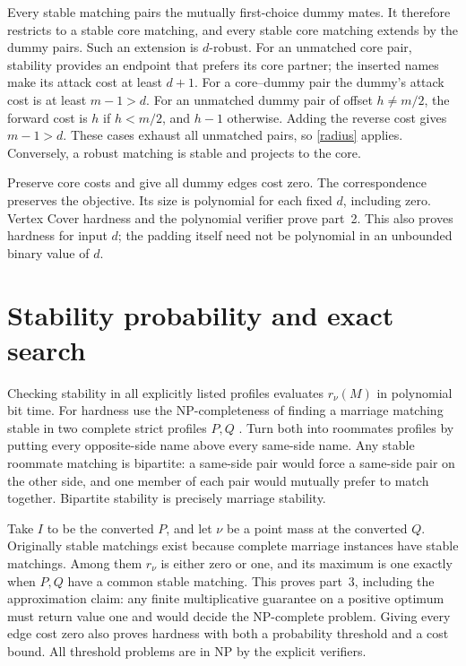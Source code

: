 \documentclass[11pt]{article}
\begin{document}
Every stable matching pairs the mutually first-choice dummy mates.
It therefore restricts to a stable core matching, and every stable core
matching extends by the dummy pairs. Such an extension is $d$-robust.
For an unmatched core pair, stability provides an endpoint that prefers
its core partner; the inserted names make its attack cost at least $d+1$.
For a core--dummy pair the dummy's attack cost is at least $m-1>d$.
For an unmatched dummy pair of offset $h\ne m/2$, the forward cost is
$h$ if $h<m/2$, and $h-1$ otherwise. Adding the reverse cost gives
$m-1>d$. These cases exhaust all unmatched pairs, so
\eqref{radius} applies. Conversely, a robust matching is stable and
projects to the core.

Preserve core costs and give all dummy edges cost zero. The correspondence
preserves the objective. Its size is polynomial for each fixed $d$,
including zero. Vertex Cover hardness and the polynomial verifier prove
part~2. This also proves hardness for input $d$; the padding itself need
not be polynomial in an unbounded binary value of $d$.

\section{Stability probability and exact search}
Checking stability in all explicitly listed profiles evaluates $r_\nu(M)$
in polynomial bit time. For hardness use the NP-completeness of finding
a marriage matching stable in two complete strict profiles $P,Q$
\cite[Corollary 5]{joint}. Turn both into roommates profiles by putting
every opposite-side name above every same-side name. Any stable roommate
matching is bipartite: a same-side pair would force a same-side pair on
the other side, and one member of each pair would mutually prefer to
match together. Bipartite stability is precisely marriage stability.

Take $I$ to be the converted $P$, and let $\nu$ be a point mass at the
converted $Q$. Originally stable matchings exist because complete
marriage instances have stable matchings. Among them $r_\nu$ is either
zero or one, and its maximum is one exactly when $P,Q$ have a common
stable matching. This proves part~3, including the approximation claim:
any finite multiplicative guarantee on a positive optimum must return
value one and would decide the NP-complete problem. Giving every edge
cost zero also proves hardness with both a probability threshold and a
cost bound. All threshold problems are in NP by the explicit verifiers.
\end{document}
